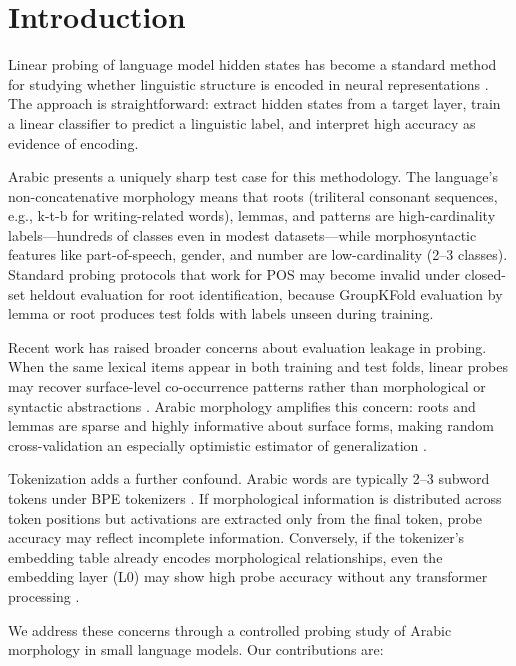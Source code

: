 \documentclass[11pt,a4paper]{article}
\begin{document}
\section{Introduction}

Linear probing of language model hidden states has become a standard method for studying whether linguistic structure is encoded in neural representations \citep{hewitt-liang-2019, tenney-etal-2019-iclr}. The approach is straightforward: extract hidden states from a target layer, train a linear classifier to predict a linguistic label, and interpret high accuracy as evidence of encoding.

Arabic presents a uniquely sharp test case for this methodology. The language's non-concatenative morphology means that roots (triliteral consonant sequences, e.g., k-t-b for writing-related words), lemmas, and patterns are high-cardinality labels---hundreds of classes even in modest datasets---while morphosyntactic features like part-of-speech, gender, and number are low-cardinality (2--3 classes). Standard probing protocols that work for POS may become invalid under closed-set heldout evaluation for root identification, because GroupKFold evaluation by lemma or root produces test folds with labels unseen during training.

Recent work has raised broader concerns about evaluation leakage in probing. When the same lexical items appear in both training and test folds, linear probes may recover surface-level co-occurrence patterns rather than morphological or syntactic abstractions \citep{gorman-bedrick-2019, sogaard-etal-2021}. Arabic morphology amplifies this concern: roots and lemmas are sparse and highly informative about surface forms, making random cross-validation an especially optimistic estimator of generalization \citep{sogaard-2020-leak}.

Tokenization adds a further confound. Arabic words are typically 2--3 subword tokens under BPE tokenizers \citep{sennrich-etal-2016}. If morphological information is distributed across token positions but activations are extracted only from the final token, probe accuracy may reflect incomplete information. Conversely, if the tokenizer's embedding table already encodes morphological relationships, even the embedding layer (L0) may show high probe accuracy without any transformer processing \citep{alakeel-etal-2026}.

We address these concerns through a controlled probing study of Arabic morphology in small language models. Our contributions are:
\end{document}
